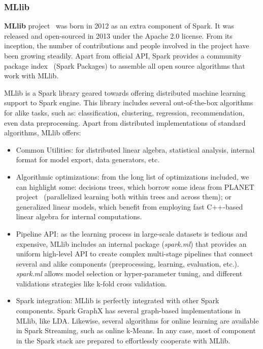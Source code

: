\documentclass[3p,review]{elsarticle}
\begin{document}
\subsubsection{MLlib}


\textbf{MLlib} project~\cite{mllib15} was born in 2012 as an extra component of Spark. It was released and open-sourced in 2013 under the Apache 2.0 license. From its inception, the number of contributions and people involved in the project have been growing steadily. Apart from official API, Spark provides a community package index~\cite{sparkpackages} (Spark Packages) to assemble all open source algorithms that work with MLlib. 

MLlib is a Spark library geared towards offering distributed machine learning support to Spark engine. This library includes several out-of-the-box algorithms for alike tasks, such as: classification, clustering, regression, recommendation, even data preprocessing. Apart from distributed implementations of standard algorithms, MLlib offers:

\begin{itemize}
	\item Common Utilities: for distributed linear algebra, statistical analysis, internal format for model export, data generators, etc. 
	\item Algorithmic optimizations: from the long list of optimizations included, we can highlight some: decisions trees, which borrow some ideas from PLANET project~\cite{panda09} (parallelized learning both within trees and across them); or generalized linear models, which benefit from employing fast C++-based linear algebra for internal computations.
	\item Pipeline API: as the learning process in large-scale datasets is tedious and expensive, MLlib includes an internal package (\emph{spark.ml}) that provides an uniform high-level API to create complex multi-stage pipelines that connect several and alike components (preprocessing, learning, evaluation, etc.). \emph{spark.ml} allows model selection or hyper-parameter tuning, and different validations strategies like k-fold cross validation.
	\item Spark integration: MLlib is perfectly integrated with other Spark components. Spark GraphX has several graph-based implementations in MLlib, like LDA. Likewise, several algorithms for online learning are available in Spark Streaming, such as online k-Means. In any case, most of component in the Spark stack are prepared to effortlessly cooperate with MLlib.
\end{itemize}
\end{document}
